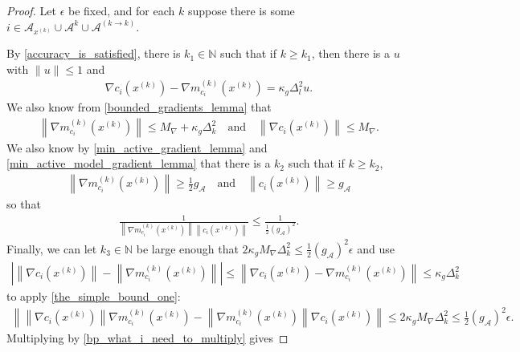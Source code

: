 \documentclass{article}
\theoremstyle{case}
\numberwithin{theorem}{subsection}
\newcommand{\dk}{\Delta_k}
\newcommand{\gmcik}{{\nabla m_{c_i}^{(k)}\left(\xk\right)}}
\newcommand{\maxgrad}{{M_{\nabla}}}
\newcommand{\minactivegrad}{{ g_{\mathcal A} }}
\newcommand{\naturals}{\mathbb N}
\newcommand{\xk}{x^{(k)}}
\begin{document}
\begin{proof}
Let $\epsilon$ be fixed, and for each $k$ suppose there is some $i \in \mathcal A_{\xk} \cup \mathcal A^{k} \cup \mathcal A^{(k \to k)} $.

By \cref{accuracy_is_satisfied}, there is $k_1 \in \naturals$ such that if $k \ge k_1$, then there is a $u$ with $\|u\| \le 1$ and
\begin{align*}
\nabla c_i\left( \xk \right) - \gmcik = \kappa_g \Delta_{l}^2 u.
\end{align*}
We also know from \cref{bounded_gradients_lemma} that
\begin{align*}
\left\|\gmcik\right\| \le \maxgrad + \kappa_g \dk^2 \quad \textrm{and} \quad \left\|\nabla c_i(\xk) \right\| \le \maxgrad.
\end{align*}
We also know by \cref{min_active_gradient_lemma} and \cref{min_active_model_gradient_lemma} that there is a $k_2$ such that if $k \ge k_2$,
\begin{align*}
\left\|\gmcik \right\| \ge \frac 1 2 \minactivegrad \quad \textrm{and} \quad \left\|c_i\left(\xk\right)\right\| \ge \minactivegrad
\end{align*}
so that
\begin{align}
\frac {1} {\left\|\gmcik \right\|  \left\|c_i\left(\xk\right)\right\|  } \le \frac 1 {\frac 1 2 \left(\minactivegrad\right)^2}. \label{bp_what_i_need_to_multiply}
\end{align}
Finally, we can let $k_3 \in \naturals$ be large enough that $2 \kappa_g\maxgrad \dk^2 \le \frac 1 2 \left(\minactivegrad\right)^2\epsilon$ and use
\begin{align}
\left|\left\|\nabla c_i\left(\xk \right)\right\|  - \left\|\gmcik\right\|\right| \le \left\|\nabla c_i\left( \xk \right) - \gmcik\right\| \le \kappa_g \dk^2 \label{bp_asdfasdffdsafdsa}
\end{align}
to apply \cref{the_simple_bound_one}: 
\begin{align*}
\left\|\left\|\nabla c_i\left(\xk \right)\right\| {\gmcik} - \left\|\gmcik\right\|\nabla c_i\left(\xk\right)\right\|
\le 2 \kappa_g\maxgrad \dk^2 \le \frac 1 2 \left(\minactivegrad\right)^2\epsilon.
\end{align*}
Multiplying by \cref{bp_what_i_need_to_multiply} gives

\end{proof}
\end{document}
